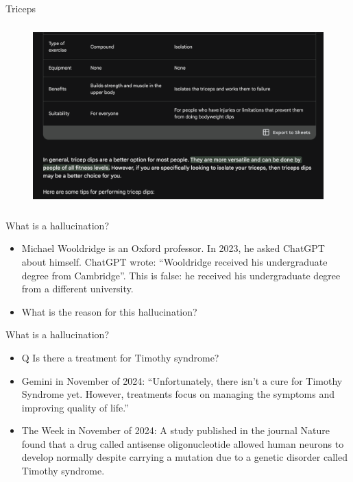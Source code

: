 \begin{vbframe}{Triceps}
\begin{figure}
\centering
\includegraphics[height = 7cm]{figure/triceps3.png}
\end{figure}
\vfill
\end{vbframe}



\begin{vbframe}{What is a hallucination?}

\vfill


	\begin{itemize}


\item
Michael Wooldridge is an Oxford professor. In 2023, he
asked ChatGPT about himself. ChatGPT wrote:
``Wooldridge received his undergraduate degree from
Cambridge''. This is false:
he received his undergraduate degree from a different
university.

\item \ques What is the reason for this hallucination?

\end{itemize}

\vfill

\end{vbframe}


\begin{vbframe}{What is a hallucination?}

\vfill


	\begin{itemize}


\item Q Is there a treatment for Timothy syndrome?
\item Gemini in November of 2024:
``Unfortunately, there isn't a cure for Timothy Syndrome
yet. However, treatments focus on managing the symptoms and
improving quality of life.''
\item The Week in November of 2024:
A study published in the journal Nature found that a drug
called antisense oligonucleotide allowed human neurons to
develop normally despite carrying a mutation due to a
genetic disorder called Timothy syndrome.
\end{itemize}


\vfill

\end{vbframe}


